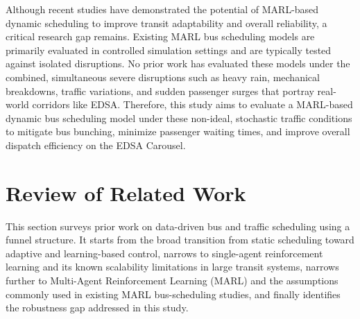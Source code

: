 Although recent studies have demonstrated the potential of MARL-based dynamic scheduling to improve transit adaptability and overall reliability, a critical research gap remains. Existing MARL bus scheduling models are primarily evaluated in controlled simulation settings and are typically tested against isolated disruptions. No prior work has evaluated these models under the combined, simultaneous severe disruptions such as heavy rain, mechanical breakdowns, traffic variations, and sudden passenger surges that portray real-world corridors like EDSA. Therefore, this study aims to evaluate a MARL-based dynamic bus scheduling model under these non-ideal, stochastic traffic conditions to mitigate bus bunching, minimize passenger waiting times, and improve overall dispatch efficiency on the EDSA Carousel.

\fi
\clearpage
\section{Review of Related Work}
This section surveys prior work on data-driven bus and traffic scheduling using a funnel structure. It starts from the broad transition from static scheduling toward adaptive and learning-based control, narrows to single-agent reinforcement learning and its known scalability limitations in large transit systems, narrows further to Multi-Agent Reinforcement Learning (MARL) and the assumptions commonly used in existing MARL bus-scheduling studies, and finally identifies the robustness gap addressed in this study.

